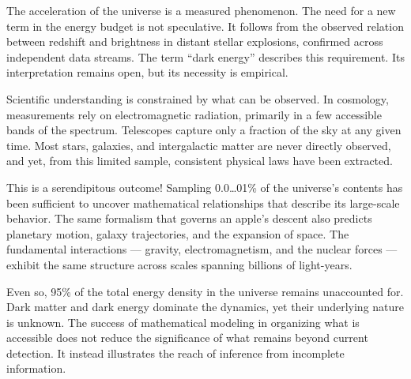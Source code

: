 The acceleration of the universe is a measured phenomenon. The need for a new term in the energy budget is not speculative. It follows from the observed relation between redshift and brightness in distant stellar explosions, confirmed across independent data streams. The term “dark energy” describes this requirement. Its interpretation remains open, but its necessity is empirical.

\begin{commentary}
Scientific understanding is constrained by what can be observed. In cosmology, measurements rely on electromagnetic radiation, primarily in a few accessible bands of the spectrum. Telescopes capture only a fraction of the sky at any given time. Most stars, galaxies, and intergalactic matter are never directly observed, and yet, from this limited sample, consistent physical laws have been extracted.

This is a serendipitous outcome! Sampling 0.0\ldots01\% of the universe’s contents has been sufficient to uncover mathematical relationships that describe its large-scale behavior. The same formalism that governs an apple’s descent also predicts planetary motion, galaxy trajectories, and the expansion of space. The fundamental interactions — gravity, electromagnetism, and the nuclear forces — exhibit the same structure across scales spanning billions of light-years.

Even so, 95\% of the total energy density in the universe remains unaccounted for. Dark matter and dark energy dominate the dynamics, yet their underlying nature is unknown. The success of mathematical modeling in organizing what is accessible does not reduce the significance of what remains beyond current detection. It instead illustrates the reach of inference from incomplete information.

\end{commentary}


